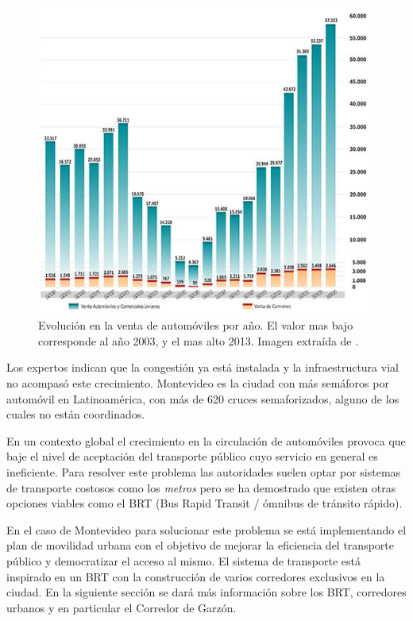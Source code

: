 \begin{figure}[H]
	\centering
	\includegraphics[width=0.9\linewidth]{Figures/ventas_autos}
	\caption{Evolución en la venta de automóviles por año. El valor mas bajo corresponde al año 2003, y el mas alto 2013. Imagen extraída de \citet{Autoanuario2014}.	
	}
	\label{fig:ventas_autos}
\end{figure}


Los expertos indican que la congestión ya está instalada y la infraestructura vial no acompasó este crecimiento. Montevideo es la ciudad con más semáforos por automóvil en Latinoamérica, con más de 620 cruces semaforizados, alguno de los cuales no están coordinados.\citep{Subrayado2013}

En un contexto global el crecimiento en la circulación de automóviles provoca que baje el nivel de aceptación del transporte público cuyo servicio en general es ineficiente. Para resolver este problema las autoridades suelen optar por sistemas de transporte costosos como los \emph{metros} pero se ha demostrado que existen otras opciones viables como el BRT (Bus Rapid Transit / ómnibus de tránsito rápido)\citep{BRT_Dial}.

En el caso de Montevideo para solucionar este problema se está implementando el plan de movilidad urbana \citep{PlanMovilidad} con el objetivo de mejorar la eficiencia del transporte público y democratizar el acceso al mismo. El sistema de transporte está inspirado en un BRT con la construcción de varios corredores exclusivos en la ciudad. En la siguiente sección se dará más información sobre los BRT, corredores urbanos y en particular el Corredor de Garzón.



